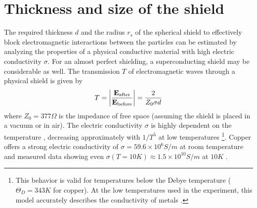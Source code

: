 \section{Thickness and size of the shield}\label{sec:5:shield-size}
The required thickness $d$ and the radius $r_s$ of the spherical shield to effectively block electromagnetic interactions between the particles can be estimated by analyzing the properties of a physical conductive material with high electric conductivity $\sigma$.
For an almost perfect shielding, a superconducting shield may be considerable as well.
The transmission $T$ of electromagnetic waves through a physical shield is given by \cite{Vandenbosch_2022}
\begin{equation}\label{eq:5:shield-transmission}
  T = \abs{\frac{\vec{E}_\mathrm{after}}{\vec{E}_\mathrm{before}}} = \frac{2}{Z_0 \sigma d}
\end{equation}
where $Z_0 = 377\si{\Omega}$ is the impedance of free space (assuming the shield is placed in a vacuum or in air).
The electric conductivity $\sigma$ is highly dependent on the temperature \cite[p. 284-286]{Gross_2018}, decreasing approximately with $1/T^5$ at low temperatures \footnote{This behavior is valid for temperatures below the Debye temperature ($\Theta_D = 343\si{K}$ for copper). At the low temperatures used in the experiment, this model accurately describes the conductivity of metals \cite{Berman_1952}.}.
Copper offers a strong electric conductivity of $\sigma = 59.6\times 10^6 \si{S/m}$ at room temperature and measured data showing even $\sigma(T = 10\si{K}) \approx 1.5\times 10^{10}\si{S/m}$ at $10\si{K}$ \cite{Berman_1952}.

